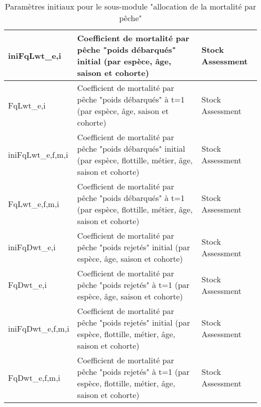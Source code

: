 \documentclass[12pt, colorinlistoftodos]{article}
\begin{document}
\begin{table}[h]
\begin{center}
\begin{tabularx}{\textwidth}{|L| X | X|}
        iniFqLwt_{e,i} & Coefficient de mortalité par pêche "poids débarqués" initial (par espèce, âge, saison et cohorte) & Stock Assessment \\ \hline
        FqLwt_{e,i} & Coefficient de mortalité par pêche "poids débarqués" à t=1 (par espèce, âge, saison et cohorte) & Stock Assessment \\ \hline
        iniFqLwt_{e,f,m,i} & Coefficient de mortalité par pêche "poids débarqués" initial (par espèce, flottille, métier, âge, saison et cohorte) & Stock Assessment \\ \hline
        FqLwt_{e,f,m,i} & Coefficient de mortalité par pêche "poids débarqués" à t=1 (par espèce, flottille, métier, âge, saison et cohorte) & Stock Assessment \\ \hline

        iniFqDwt_{e,i} & Coefficient de mortalité par pêche "poids rejetés" initial (par espèce, âge, saison et cohorte) & Stock Assessment \\ \hline
        FqDwt_{e,i} & Coefficient de mortalité par pêche "poids rejetés" à t=1 (par espèce, âge, saison et cohorte) & Stock Assessment \\ \hline
        iniFqDwt_{e,f,m,i} & Coefficient de mortalité par pêche "poids rejetés" initial (par espèce, flottille, métier, âge, saison et cohorte) & Stock Assessment \\ \hline
        FqDwt_{e,f,m,i} & Coefficient de mortalité par pêche "poids rejetés" à t=1 (par espèce, flottille, métier, âge, saison et cohorte) & Stock Assessment \\ \hline
        \hline
        \end{tabularx}
\end{center}
    \label{neat}
    \caption{Paramètres initiaux pour le sous-module "allocation de la mortalité par pêche"}
\end{table}
\end{document}
